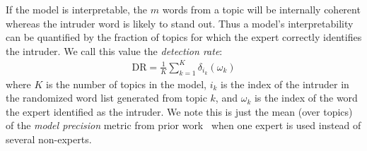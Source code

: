 \documentclass[11pt,letterpaper]{article}
\newcommand{\dirac}[2]{\delta_{#1}\left(#2\right)}
\newcommand{\DR}{\ensuremath{\textrm{DR}}}
\newcommand{\Note}[3]{\sethlcolor{#2}\hl{[\textbf{#1}: #3]}}
\renewcommand{\Note}[3]{}
\newcommand{\ryan}[1]{\Note{ryan}{lightorange}{#1}}
\newcommand{\todo}[1]{\Note{todo}{red}{#1}}
\begin{document}
{%

\todo{explain all those Russian words in figure/table, or remove}

If the model is interpretable, the $m$ words from a topic will be
internally coherent whereas the intruder word is likely to stand out.
Thus a model's interpretability can be quantified by the fraction
of topics for which the expert correctly identifies the intruder.  We
call this value the \emph{detection rate}:
\begin{align*}
    \DR = \frac{1}{K} \sum_{k=1}^K \dirac{i_k}{\omega_k}
\end{align*}
where $K$ is the number of topics in the model, $i_k$ is the index
of the intruder in the randomized word list generated from topic $k$,
and $\omega_k$ is the index of the word the expert identified as the
intruder.  We note this is just the mean (over topics) of the
\emph{model precision} metric from prior work~\cite{chang2009}
when one expert is used instead of several non-experts.

}
\end{document}
